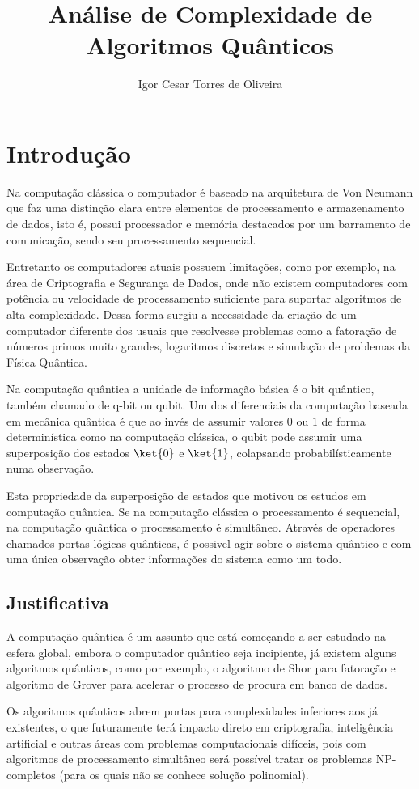 \documentclass[inci,lof,loc]{imetex}
\author{Igor Cesar Torres de Oliveira}
\title{Análise de Complexidade de Algoritmos Quânticos}
\date{\the\year}
\begin{document}
\chapter{Introdução}
Na computação clássica o computador é baseado na arquitetura de Von Neumann que faz uma distinção clara entre elementos de processamento e armazenamento de dados, isto é, possui processador e memória destacados por um barramento de comunicação, sendo seu processamento sequencial.
 
Entretanto os computadores atuais possuem limitações, como por exemplo, na área de Criptografia e Segurança de Dados, onde não existem computadores com potência ou velocidade de processamento suficiente para suportar algoritmos de alta complexidade. Dessa forma surgiu a necessidade da criação de um computador diferente dos usuais que resolvesse problemas como a fatoração de números primos muito grandes, logaritmos discretos e simulação de problemas da Física Quântica.
  
Na computação quântica a unidade de informação básica é o bit quântico, também chamado de q-bit ou qubit. Um dos diferenciais da computação baseada em mecânica quântica é que ao invés de assumir valores $0$ ou $1$ de forma determinística como na computação clássica, o qubit pode assumir uma superposição dos estados $\ket{0}$ e $\ket{1}$, colapsando probabilísticamente numa observação.
 
Esta propriedade da superposição de estados que motivou os estudos em computação quântica. Se na computação clássica o processamento é sequencial, na computação quântica o processamento é simultâneo. Através de operadores chamados portas lógicas quânticas, é possivel agir sobre o sistema quântico e com uma única observação obter informações do sistema como um todo.

\section{Justificativa}
A computação quântica é um assunto que está começando a ser estudado na esfera global, embora o computador quântico seja incipiente, já existem alguns algoritmos quânticos, como por exemplo, o algoritmo de Shor para fatoração e algoritmo de Grover para acelerar o processo de procura em banco de dados.
 
Os algoritmos quânticos abrem portas para complexidades inferiores aos já existentes, o que futuramente terá impacto direto em criptografia, inteligência artificial e outras áreas com problemas computacionais difíceis, pois com algoritmos de processamento simultâneo será possível tratar os problemas NP-completos (para os quais não se conhece solução polinomial).
\end{document}

